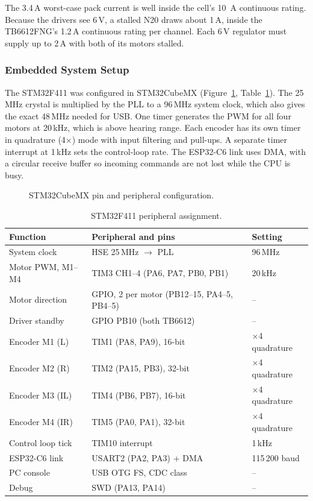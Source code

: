 \documentclass[12pt,a4paper]{article}
\begin{document}
The 3.4\,A worst-case pack current is well inside the cell's \SI{10}{A}
continuous rating. Because the drivers see 6\,V, a stalled N20 draws about
1\,A, inside the TB6612FNG's 1.2\,A continuous rating per channel. Each 6\,V
regulator must supply up to 2\,A with both of its motors stalled.

\subsubsection{Embedded System Setup}

The STM32F411 was configured in STM32CubeMX (Figure~\ref{fig:a1-cubemx},
Table~\ref{tab:a1-periph}). The 25\,MHz crystal is multiplied by the PLL to a
96\,MHz system clock, which also gives the exact 48\,MHz needed for USB. One
timer generates the PWM for all four motors at 20\,kHz, which is above
hearing range. Each encoder has its own timer in quadrature (4$\times$) mode
with input filtering and pull-ups. A separate timer interrupt at 1\,kHz sets
the control-loop rate. The ESP32-C6 link uses DMA, with a circular receive
buffer so incoming commands are not lost while the CPU is busy.

\begin{figure}[!htbp]
  \centering
  \caption{STM32CubeMX pin and peripheral configuration.}
  \label{fig:a1-cubemx}
\end{figure}

\begin{table}[H]
\centering\small
\caption{STM32F411 peripheral assignment.}
\label{tab:a1-periph}
\begin{tabular}{@{}lll@{}}
\toprule
\textbf{Function} & \textbf{Peripheral and pins} & \textbf{Setting} \\
\midrule
System clock & HSE 25\,MHz $\rightarrow$ PLL & 96\,MHz \\
Motor PWM, M1--M4 & TIM3 CH1--4 (PA6, PA7, PB0, PB1) & 20\,kHz \\
Motor direction & GPIO, 2 per motor (PB12--15, PA4--5, PB4--5) & -- \\
Driver standby & GPIO PB10 (both TB6612) & -- \\
Encoder M1 (L) & TIM1 (PA8, PA9), 16-bit & $\times$4 quadrature \\
Encoder M2 (R) & TIM2 (PA15, PB3), 32-bit & $\times$4 quadrature \\
Encoder M3 (IL) & TIM4 (PB6, PB7), 16-bit & $\times$4 quadrature \\
Encoder M4 (IR) & TIM5 (PA0, PA1), 32-bit & $\times$4 quadrature \\
Control loop tick & TIM10 interrupt & 1\,kHz \\
ESP32-C6 link & USART2 (PA2, PA3) + DMA & 115\,200 baud \\
PC console & USB OTG FS, CDC class & -- \\
Debug & SWD (PA13, PA14) & -- \\
\bottomrule
\end{tabular}
\end{table}
\end{document}
